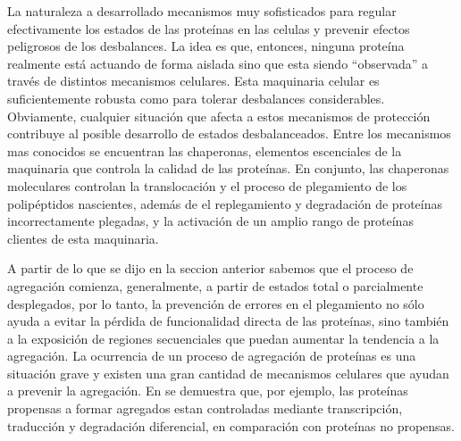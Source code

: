La naturaleza a desarrollado mecanismos muy sofisticados para regular efectivamente los estados de las proteínas en las celulas y prevenir efectos peligrosos de los desbalances.
La idea es que, entonces, ninguna proteína realmente está actuando de forma aislada sino que esta siendo ``observada'' a través de distintos mecanismos celulares. 
Esta maquinaria celular es suficientemente robusta como para tolerar desbalances considerables.
Obviamente, cualquier situación que afecta a estos mecanismos de protección contribuye al posible desarrollo de estados desbalanceados.
Entre los mecanismos mas conocidos se encuentran las chaperonas, elementos escenciales de la maquinaria que controla la calidad de las proteínas.
En conjunto, las chaperonas moleculares controlan la translocación y el proceso de plegamiento de los polipéptidos nascientes, además de el replegamiento y degradación de proteínas incorrectamente plegadas, 
y la activación de un amplio rango de proteínas clientes de esta maquinaria.


A partir de lo que se dijo en la seccion anterior sabemos que el proceso de agregación comienza, generalmente, a partir de estados total o parcialmente desplegados,
por lo tanto, la prevención de errores en el plegamiento no sólo ayuda a evitar la pérdida de funcionalidad directa de las proteínas, sino también a la exposición de regiones secuenciales que puedan aumentar la tendencia a la agregación. 
La ocurrencia de un proceso de agregación de proteínas es una situación grave y existen una gran cantidad de mecanismos celulares que ayudan a prevenir la agregación.
En \cite{gsponer2012cellular} se demuestra que, por ejemplo, las proteínas propensas a formar agregados estan controladas mediante transcripción, traducción y degradación diferencial, en comparación con proteínas no propensas.


